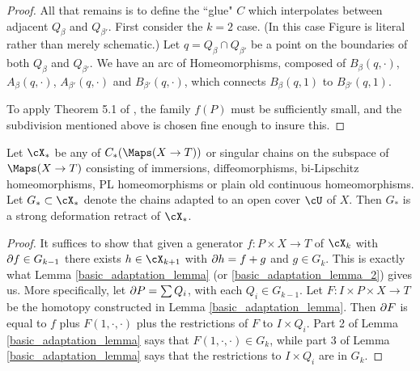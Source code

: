 \begin{proof}
All that remains is to define the ``glue" $C$ which interpolates between adjacent $Q_\beta$ and $Q_{\beta'}$.
First consider the $k=2$ case.
(In this case Figure  is literal rather than merely schematic.)
Let $q = Q_\beta \cap Q_{\beta'}$ be a point on the boundaries of both $Q_\beta$ and $Q_{\beta'}$.
We have an arc of Homeomorphisms, composed of $B_\beta(q, \cdot)$, $A_\beta(q, \cdot)$, 
$A_{\beta'}(q, \cdot)$ and $B_{\beta'}(q, \cdot)$, which connects $B_\beta(q, 1)$ to $B_{\beta'}(q, 1)$.







To apply Theorem 5.1 of \cite{MR0283802}, the family $f(P)$ must be sufficiently small,
and the subdivision mentioned above is chosen fine enough to insure this.

\end{proof}



\begin{lemma} \label{extension_lemma_c}
Let $\cX_*$ be any of $C_*(\Maps(X \to T))$ or singular chains on the 
subspace of $\Maps(X\to T)$ consisting of immersions, diffeomorphisms, 
bi-Lipschitz homeomorphisms, PL homeomorphisms or plain old continuous homeomorphisms.
Let $G_* \subset \cX_*$ denote the chains adapted to an open cover $\cU$
of $X$.
Then $G_*$ is a strong deformation retract of $\cX_*$.
\end{lemma}
\begin{proof}
It suffices to show that given a generator $f:P\times X\to T$ of $\cX_k$ with
$\partial f \in G_{k-1}$ there exists $h\in \cX_{k+1}$ with $\partial h = f + g$ and $g \in G_k$.
This is exactly what Lemma \ref{basic_adaptation_lemma} (or \ref{basic_adaptation_lemma_2})
gives us.
More specifically, let $\partial P = \sum Q_i$, with each $Q_i\in G_{k-1}$.
Let $F: I\times P\times X\to T$ be the homotopy constructed in Lemma \ref{basic_adaptation_lemma}.
Then $\partial F$ is equal to $f$ plus $F(1, \cdot, \cdot)$ plus the restrictions of $F$ to $I\times Q_i$.
Part 2 of Lemma \ref{basic_adaptation_lemma} says that $F(1, \cdot, \cdot)\in G_k$,
while part 3 of Lemma \ref{basic_adaptation_lemma} says that the restrictions to $I\times Q_i$ are in $G_k$.
\end{proof}

\medskip


